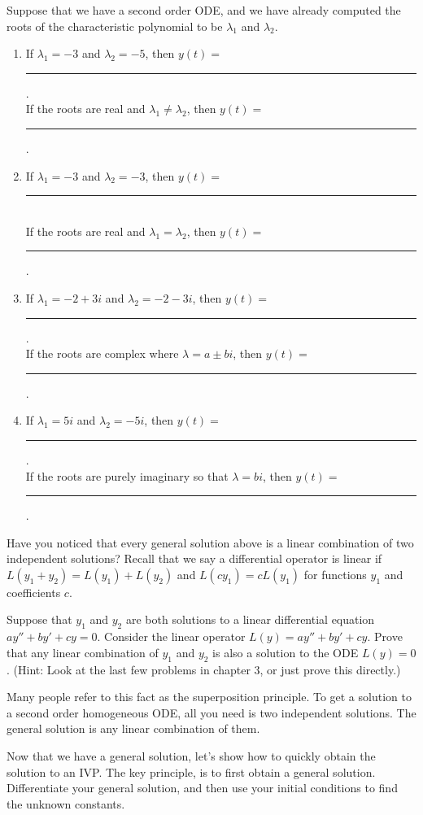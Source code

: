 \begin{problem*}[5.19 Improved]
 Suppose that we have a second order ODE, and we have already computed the roots of the characteristic polynomial to be $\lambda_1$ and $\lambda_2$. 
\begin{enumerate}
 \item If $\lambda_1=-3$ and $\lambda_2=-5$, then $y(t) = $\rule{1in}{.5pt}.\\
 If the roots are real and $\lambda_1 \neq \lambda_2$, then $y(t) = $\rule{1in}{.5pt}.
 \item If $\lambda_1=-3$ and $\lambda_2=-3$, then $y(t) = $\rule{1in}{.5pt}\\
 If the roots are real and $\lambda_1  =   \lambda_2$, then $y(t) = $\rule{1in}{.5pt}.
 \item If $\lambda_1 = -2+3i$ and $\lambda_2=-2-3i$, then $y(t) = $\rule{1in}{.5pt}. \\
 If the roots are complex where $\lambda = a\pm bi$, then $y(t) = $\rule{1in}{.5pt}.
 \item If $\lambda_1 = 5i$ and $\lambda_2=-5i$, then $y(t) = $\rule{1in}{.5pt}. \\
 If the roots are purely imaginary so that $\lambda = bi$, then $y(t) = $\rule{1in}{.5pt}.
\end{enumerate}

\end{problem*}

Have you noticed that every general solution above is a linear combination of two independent solutions?  Recall that we say a differential operator is linear if $L(y_1+y_2) = L(y_1)+L(y_2)$ and $L(cy_1)=cL(y_1)$ for functions $y_1$ and coefficients $c$.  
\begin{problem}
 Suppose that $y_1$ and $y_2$ are both solutions to a linear differential equation $ay''+b y'+cy=0$.  Consider the linear operator $L(y) = ay''+by'+cy$.  Prove that any linear combination of $y_1$ and $y_2$ is also a solution to the ODE $L(y)=0$. (Hint:  Look at the last few problems in chapter 3, or just prove this directly.)  

 Many people refer to this fact as the superposition principle. To get a solution to a second order homogeneous ODE, all you need is two independent solutions. The general solution is any linear combination of them.
\end{problem}

Now that we have a general solution, let's show how to quickly obtain the solution to an IVP. The key principle, is to first obtain a general solution. Differentiate your general solution, and then use your initial conditions to find the unknown constants.

